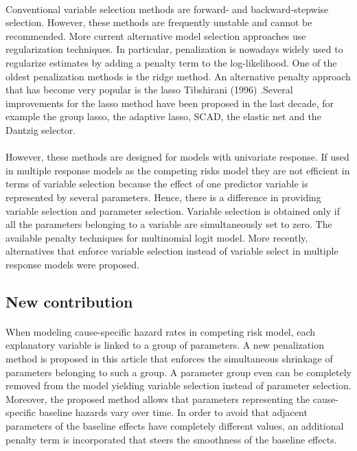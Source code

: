 \documentclass[]{article}
\begin{document}
        \paragraph{}Conventional variable selection methods are forward- and backward-stepwise selection. However, these methods are frequently unstable and cannot be recommended. More current alternative model selection approaches use regularization techniques. In particular, penalization is nowadays widely used to regularize estimates by adding a penalty term to the log-likelihood. One of the oldest penalization methods is the ridge method. An alternative penalty approach that has become very popular is the lasso Tibshirani (1996) .Several improvements for the lasso method have been proposed in the last decade, for example the group lasso, the adaptive lasso, SCAD, the elastic net and the Dantzig selector.
        \paragraph{}However, these methods are designed for models with univariate response. If used in multiple response models as the competing risks model they are not efficient in terms of variable selection because the effect of one predictor variable is represented by several parameters. Hence, there is a difference in providing variable selection and parameter selection. Variable selection is obtained only if all the parameters belonging to a variable are simultaneously set to zero. The available penalty techniques for multinomial logit model. More recently, alternatives that enforce variable selection instead of variable select in multiple response models were proposed.
    \subsection{New contribution}
        \paragraph{}When modeling cause-specific hazard rates in competing risk model, each explanatory variable is linked to a group of parameters. A new penalization method is proposed in this article that enforces the simultaneous shrinkage of parameters belonging to such a group. A parameter group even can be completely removed from the model yielding variable selection instead of
        parameter selection. Moreover, the proposed method allows that parameters representing the cause-specific baseline hazards vary over time. In order to avoid that adjacent parameters of the baseline effects have completely different values, an additional penalty
        term is incorporated that steers the smoothness of the baseline effects.
\end{document}

